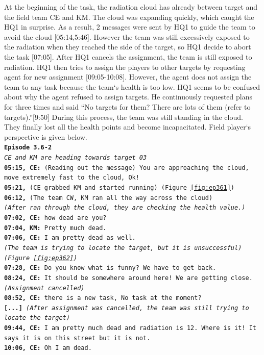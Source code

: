 At the beginning of the task, the radiation cloud has already between target and the field team CE and KM. The cloud was expanding quickly, which caught the HQ1 in surprise. As a result, 2 messages were sent by HQ1 to guide the team to avoid the cloud [05:14,5:46]. However the team was still excessively exposed to the radiation when they reached the side of the target, so HQ1 decide to abort the task [07:05]. After HQ1 cancels the assignment, the team is still exposed to radiation. HQ1 then tries to assign the players to other targets by requesting agent for new assignment [09:05-10:08]. However, the agent does not assign the team to any task because the team`s health is too low. HQ1 seems to be confused about why the agent refused to assign targets. He continuously requested plans for three times and said ``No targets for them? There are lots of them (refer to targets).''[9:50] During this process, the team was still standing in the cloud. They finally lost all the health points and become incapacitated. Field player`s perspective is given below. \\


\noindent\texttt{\textbf{Episode 3.6-2 }\\
\emph{CE and KM are heading towards target 03}\\
\textbf{05:15, CE: } (Reading out the message) You are approaching the cloud, move extremely fast to the cloud, Ok! \\
\textbf{05:21,} (CE grabbed KM and started running) (Figure \ref{fig:ep361})\\
\textbf{06:12,} (The team CW, KM ran all the way across the cloud) \\
\emph{(After ran through the cloud, they are checking the health value.)}\\
\textbf{07:02, CE: } how dead are you?\\
\textbf{07:04, KM: } Pretty much dead.\\
\textbf{07:06, CE: } I am pretty dead as well.\\
\emph{(The team is trying to locate the target, but it is unsuccessful) (Figure \ref{fig:ep362})}\\
\textbf{07:28, CE: } Do you know what is funny? We have to get back.\\
\textbf{08:24, CE: } It should be somewhere around here! We are getting close.\\
\emph{(Assignment cancelled)}\\
\textbf{08:52, CE: } there is a new task, No task at the moment? \\
\textbf{[...]} 
\emph{(After assignment was cancelled, the team was still trying to locate the target)}\\
\textbf{09:44, CE: } I am pretty much dead and radiation is 12. Where is it! It says it is on this street but it is not. \\
\textbf{10:06, CE: } Oh I am dead.\\
}

